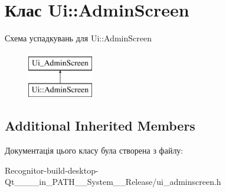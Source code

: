 \hypertarget{classUi_1_1AdminScreen}{\section{Клас Ui\-:\-:Admin\-Screen}
\label{classUi_1_1AdminScreen}
}
Схема успадкувань для Ui\-:\-:Admin\-Screen\begin{figure}[H]
\begin{center}
\leavevmode
\includegraphics[height=2.000000cm]{classUi_1_1AdminScreen}
\end{center}
\end{figure}
\subsection*{Additional Inherited Members}


Документація цього класу була створена з файлу\-:\begin{DoxyCompactItemize}
\item 
Recognitor-\/build-\/desktop-\/\-Qt\-\_\-\_\-\_\-\_\-in\-\_\-\-P\-A\-T\-H\-\_\-\-\_\-\-System\-\_\-\-\_\-\-Release/ui\-\_\-adminscreen.\-h\end{DoxyCompactItemize}
